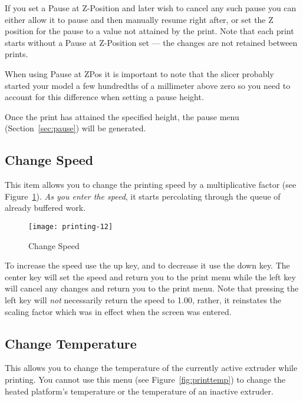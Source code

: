 If you set a Pause at Z-Position and later wish to cancel any such pause you can either allow it to pause and then manually resume right after, or set the Z position for the pause to a value not attained by the print.  Note that each print starts without a Pause at Z-Position set --- the changes are not retained between prints.

When using Pause at ZPos it is important to note that the \gls{slicer} probably started your model a few hundredths of a millimeter above zero so you need to account for this difference when setting a pause height.

Once the print has attained the specified height, the pause menu (Section~\ref{sec:pause}) will be generated.


\subsection{Change Speed}\label{sec:speed}

This item allows you to change the printing speed by a multiplicative factor (see Figure~\ref{fig:speed}).  \emph{As you enter the speed}, it starts percolating through the queue of already buffered work.

\begin{figure}[!htbp]
  \centering
    \texttt{[image: printing-12]}
    \caption{Change Speed}
  \label{fig:speed}
\end{figure}

To increase the speed use the up key, and to decrease it use the down key.  The center key will set the speed and return you to the print menu while the left key will cancel any changes and return you to the print menu.  Note that pressing the left key will \emph{not} necessarily return the speed to 1.00, rather, it reinstates the scaling factor which was in effect when the screen was entered.


\subsection{Change Temperature}\label{sec:temp}

This allows you to change the temperature of the currently active extruder while printing.  You cannot use this menu (see Figure~\ref{fig:printtemp}) to change the heated platform's temperature or the temperature of an inactive extruder.

